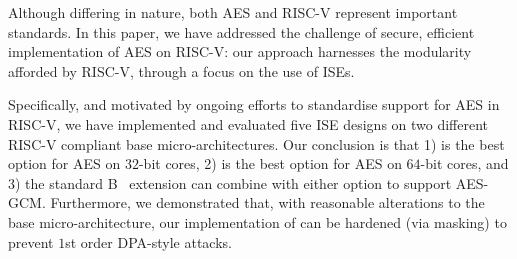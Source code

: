 
Although differing in nature, both AES and RISC-V represent important
standards.  In this paper, we have addressed the challenge of secure, 
efficient implementation of AES on RISC-V: our approach harnesses the
modularity afforded by RISC-V, through a focus on the use of ISEs.

Specifically, and motivated by ongoing efforts to standardise support 
for AES in RISC-V, we have implemented and evaluated five ISE designs 
on two different RISC-V compliant base micro-architectures.
Our conclusion is that
1) 
   is the best option for 
   AES on $32$-bit cores,
2) 
   is the best option for 
   AES on $64$-bit cores,
   and
3) the
   standard 
   B~\cite[Section 17]{RV:ISA:I:19}
   extension
   can combine with either option to support AES-GCM.
Furthermore, we demonstrated that, with reasonable alterations to the
base micro-architecture, our implementation of  can be hardened
(via masking) to prevent $1$st order DPA-style attacks.

%

